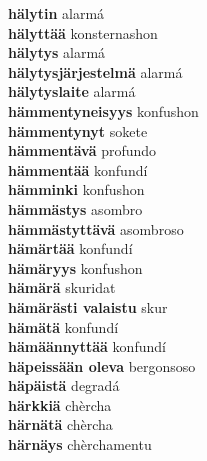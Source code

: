 \textbf{ hälytin  } alarmá \\
\textbf{ hälyttää  } konsternashon \\
\textbf{ hälytys  } alarmá \\
\textbf{ hälytysjärjestelmä  } alarmá \\
\textbf{ hälytyslaite  } alarmá \\
\textbf{ hämmentyneisyys  } konfushon \\
\textbf{ hämmentynyt  } sokete \\
\textbf{ hämmentävä  } profundo \\
\textbf{ hämmentää  } konfundí \\
\textbf{ hämminki  } konfushon \\
\textbf{ hämmästys  } asombro \\
\textbf{ hämmästyttävä  } asombroso \\
\textbf{ hämärtää  } konfundí \\
\textbf{ hämäryys  } konfushon \\
\textbf{ hämärä  } skuridat \\
\textbf{ hämärästi valaistu  } skur \\
\textbf{ hämätä  } konfundí \\
\textbf{ hämäännyttää  } konfundí \\
\textbf{ häpeissään oleva  } bergonsoso \\
\textbf{ häpäistä  } degradá \\
\textbf{ härkkiä  } chèrcha \\
\textbf{ härnätä  } chèrcha \\
\textbf{ härnäys  } chèrchamentu \\
